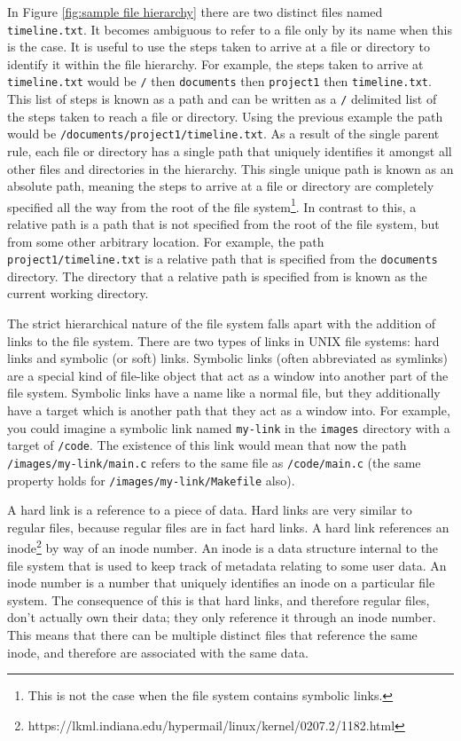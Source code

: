In Figure \ref{fig:sample file hierarchy} there are two distinct files named
\texttt{timeline.txt}. It becomes ambiguous to refer to a file only by its name
when this is the case. It is useful to use the steps taken to arrive at a file
or directory to identify it within the file hierarchy. For example, the steps
taken to arrive at \texttt{timeline.txt} would be \texttt{/} then
\texttt{documents} then \texttt{project1} then \texttt{timeline.txt}. This list
of steps is known as a path and can be written as a \texttt{/} delimited list
of the steps taken to reach a file or directory. Using the previous example the
path would be \texttt{/documents/project1/timeline.txt}. As a result of the
single parent rule, each file or directory has a single path that uniquely
identifies it amongst all other files and directories in the hierarchy. This
single unique path is known as an absolute path, meaning the steps to arrive at
a file or directory are completely specified all the way from the root of the
file system\footnote{This is not the case when the file system contains
symbolic links.}. In contrast to this, a relative path is a path that is not
specified from the root of the file system, but from some other arbitrary
location. For example, the path \texttt{project1/timeline.txt} is a relative
path that is specified from the \texttt{documents} directory. The directory
that a relative path is specified from is known as the current working
directory.

The strict hierarchical nature of the file system falls apart with the addition
of links to the file system. There are two types of links in UNIX file systems:
hard links and symbolic (or soft) links. Symbolic links (often abbreviated as
symlinks) are a special kind of file-like object that act as a window into
another part of the file system. Symbolic links have a name like a normal file,
but they additionally have a target which is another path that they act as a
window into. For example, you could imagine a symbolic link named
\texttt{my-link} in the \texttt{images} directory with a target of
\texttt{/code}. The existence of this link would mean that now the path
\texttt{/images/my-link/main.c} refers to the same file as
\texttt{/code/main.c} (the same property holds for
\texttt{/images/my-link/Makefile} also). 

A hard link is a reference to a piece of data. Hard links are very similar to
regular files, because regular files are in fact hard links. A hard link
references an inode\footnote{
https://lkml.indiana.edu/hypermail/linux/kernel/0207.2/1182.html}\cite{inode}
by way of an inode number. An inode is a data structure internal to the file
system that is used to keep track of metadata relating to some user data. An
inode number is a number that uniquely identifies an inode on a particular file
system. The consequence of this is that hard links, and therefore regular
files, don't actually own their data; they only reference it through an inode
number. This means that there can be multiple distinct files that reference the
same inode, and therefore are associated with the same data.

